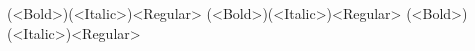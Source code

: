 \documentclass[
	12pt,
	a4paper,
	kosection,
	footnote,
	nobookmarks,
	microtype,
	figtabcapt,
]{oblivoir}
\def\cs#1{\texttt{\textbackslash #1}}
\begin{document}
\begin{boxedverbatim}
\setkormainfont(<Bold>)(<Italic>){<Regular>}
\setkorsansfont(<Bold>)(<Italic>){<Regular>}
\setkormonofont(<Bold>)(<Italic>){<Regular>}
\end{boxedverbatim}
%
%
%
%
%
\end{document}
